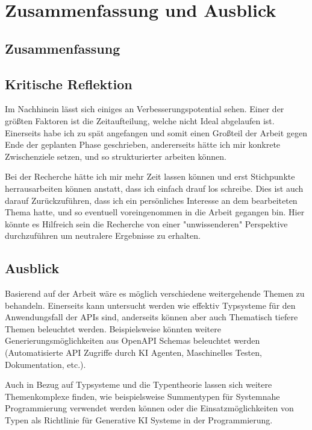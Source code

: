
\section{Zusammenfassung und Ausblick}

\subsection{Zusammenfassung}

\subsection{Kritische Reflektion} 

Im Nachhinein lässt sich einiges an Verbesserungspotential sehen. Einer der größten Faktoren ist die Zeitaufteilung,
welche nicht Ideal abgelaufen ist. Einerseits habe ich zu spät angefangen und somit einen Großteil der Arbeit gegen
Ende der geplanten Phase geschrieben, andererseits hätte ich mir konkrete Zwischenziele setzen, und so strukturierter
arbeiten können.

Bei der Recherche hätte ich mir mehr Zeit lassen können und erst Stichpunkte herrausarbeiten können anstatt, dass ich
einfach drauf los schreibe. Dies ist auch darauf Zurückzuführen, dass ich ein persönliches Interesse an dem
bearbeiteten Thema hatte, und so eventuell voreingenommen in die Arbeit gegangen bin.
Hier könnte es Hilfreich sein die Recherche von einer "unwissenderen" Perspektive durchzuführen um neutralere
Ergebnisse zu erhalten.

\subsection{Ausblick}

Basierend auf der Arbeit wäre es möglich verschiedene weitergehende Themen zu behandeln. 
Einerseits kann untersucht werden wie effektiv Typsysteme für den Anwendungsfall der APIs sind, 
anderseits können aber auch Thematisch tiefere Themen beleuchtet werden. 
Beispielsweise könnten weitere Generierungsmöglichkeiten aus OpenAPI Schemas beleuchtet werden 
(Automatisierte API Zugriffe durch KI Agenten, Maschinelles Testen, Dokumentation, etc.).

Auch in Bezug auf Typsysteme und die Typentheorie lassen sich weitere Themenkomplexe finden, wie
beispielsweise Summentypen für Systemnahe Programmierung verwendet werden können oder die Einsatzmöglichkeiten
von Typen als Richtlinie für Generative KI Systeme in der Programmierung.
